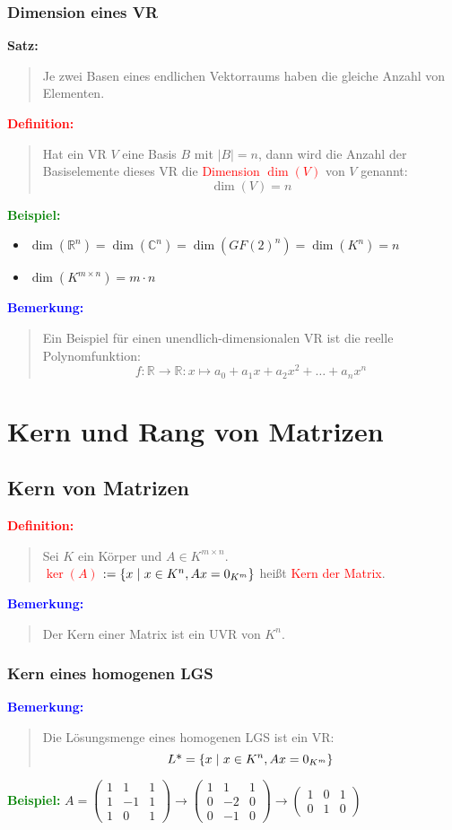 \documentclass{article}
\newcommand{\smsp}{\phantom{\hspace{3px}}}
\newcommand{\red}[1]{\textcolor{red}{#1}}
\newcommand{\blue}[1]{\textcolor{blue}{#1}}
\newcommand{\green}[1]{\textcolor{green}{#1}}
\newcommand{\dgr}[1]{\textcolor{dgr}{#1}}
\newcommand{\ex}{\green{\textbf{Beispiel: }}}
\newcommand{\de}[1]{\red{\textbf{Definition: }}\begin{quote}#1\end{quote}}
\newcommand{\an}[1]{\blue{\textbf{Bemerkung: }}\begin{quote}#1\end{quote}}
\newcommand{\se}[1]{\dgr{\textbf{Satz: }}\begin{quote}#1\end{quote}}
\newcommand{\R}{\mathbb{R}}
\newcommand{\C}{\mathbb{C}}
\renewcommand{\st}{\smsp | \smsp}
\begin{document}
\subsubsection{Dimension eines VR}

\se{
    Je zwei Basen eines endlichen Vektorraums haben die gleiche Anzahl von Elementen.
}
\de{
    Hat ein VR $V$ eine Basis $B$ mit $|B|=n$, dann wird die Anzahl der Basiselemente dieses VR die \red{Dimension $\dim(V)$} von $V$ genannt:
    \[
        \dim(V) = n
    \]
}
\ex \begin{itemize}
    \item $\dim(\R^n) = \dim(\C^n) = \dim(GF(2)^n) = \dim(K^n) = n$
    \item $\dim(K^{m \times n}) = m \cdot n$
\end{itemize}

\newpage
\an{
    Ein Beispiel für einen unendlich-dimensionalen VR ist die reelle Polynomfunktion:
    \[
        f: \R \to \R: x \mapsto a_0 + a_1x + a_2x^2 + \dots + a_nx^n
    \]
}

\section{Kern und Rang von Matrizen}

\subsection{Kern von Matrizen}

\de{
    Sei $K$ ein Körper und $A \in K^{m \times n}$.\\
    \red{$\ker(A)$} $:= \{x \st x \in K^n, Ax = 0_{K^m}\}$ heißt \red{Kern der Matrix}.
}

\an{
    Der Kern einer Matrix ist ein UVR von $K^n$.
}

\subsubsection{Kern eines homogenen LGS}

\an{
    Die Lösungsmenge eines homogenen LGS ist ein VR:
    \[
        L\text{*} = \{x \st x \in K^n, Ax = 0_{K^m}\}   
    \]
}
\ex $A = \begin{pmatrix}
    1 & 1 & 1\\
    1 & -1 & 1\\
    1 & 0 & 1
\end{pmatrix} \to \begin{pmatrix}
    1 & 1 & 1\\
    0 & -2 & 0\\
    0 & -1 & 0
\end{pmatrix} \to \begin{pmatrix}
    1 & 0 & 1\\
    0 & 1 & 0
\end{pmatrix}$
\end{document}
